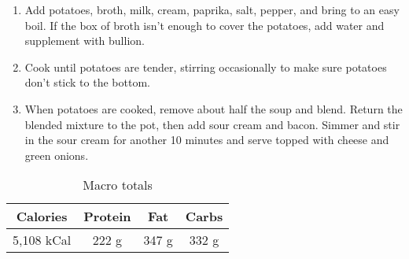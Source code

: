 \begin{multicols}{2}
\begin{enumerate}
\item Add potatoes, broth, milk, cream, paprika, salt, pepper, and bring to an easy boil. If the box of broth isn't enough to cover the potatoes, add water and supplement with bullion. 
\item Cook until potatoes are tender, stirring occasionally to make sure potatoes don't stick to the bottom. 
\item When potatoes are cooked, remove about half the soup and blend. Return the blended mixture to the pot, then add sour cream and bacon. Simmer and stir in the sour cream for another 10 minutes and serve topped with cheese and green onions. 
  
\end{enumerate}
\begin{table}[H]
  \begin{center}
    \caption{Macro totals}
    \label{tab:table1}
    \begin{tabular}{c|c|c|c} %
      \textbf{Calories} & \textbf{Protein} & \textbf{Fat} & \textbf{Carbs}\\
      \hline
      5,108 kCal & 222 g & 347 g & 332 g\\
    \end{tabular}
  \end{center}
\end{table}
\end{multicols}
